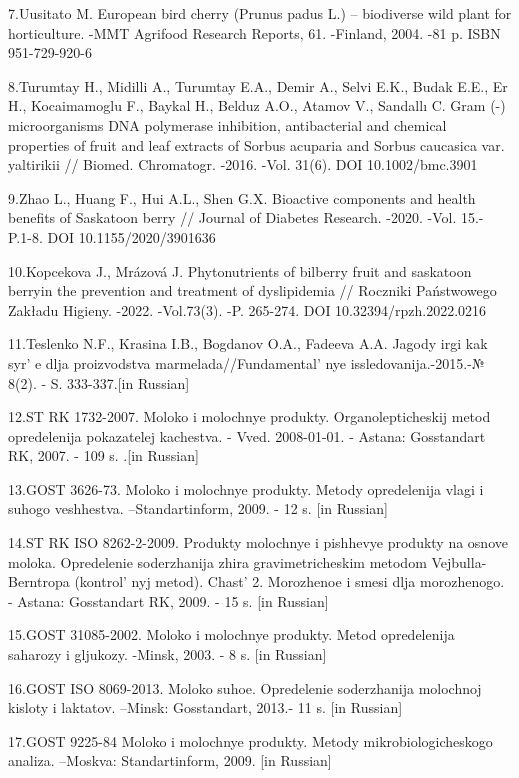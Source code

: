 {{7.Uusitato M. European bird cherry (Prunus padus L.) -- biodiverse wild
plant for horticulture. -MMT Agrifood Research Reports, 61. -Finland,
2004. -81 p. ISBN 951-729-920-6

8.Turumtay H., Midilli A., Turumtay E.A., Demir A., Selvi E.K., Budak
E.E., Er H., Kocaimamoglu F., Baykal H., Belduz A.O., Atamov V.,
Sandallı C. Gram (-) microorganisms DNA polymerase inhibition,
antibacterial and chemical properties of fruit and leaf extracts of
Sorbus acuparia and Sorbus caucasica var. yaltirikii // Biomed.
Chromatogr. -2016. -Vol. 31(6). DOI 10.1002/bmc.3901

9.Zhao L., Huang F., Hui A.L., Shen G.X. Bioactive components and health
benefits of Saskatoon berry // Journal of Diabetes Research. -2020.
-Vol. 15.- P.1-8. DOI 10.1155/2020/3901636

10.Kopcekova J., Mrázová J. Phytonutrients of bilberry fruit and
saskatoon berryin the prevention and treatment of dyslipidemia //
Roczniki Państwowego Zakładu Higieny. -2022. -Vol.73(3). -P. 265-274.
DOI 10.32394/rpzh.2022.0216

11.Teslenko N.F., Krasina I.B., Bogdanov O.A., Fadeeva A.A. Jagody irgi
kak syr' e dlja proizvodstva
marmelada//Fundamental' nye issledovanija.-2015.-№ 8(2).
- S. 333-337.{[}in Russian{]}

12.ST RK 1732-2007. Moloko i molochnye produkty. Organolepticheskij
metod opredelenija pokazatelej kachestva. - Vved. 2008-01-01. - Astana:
Gosstandart RK, 2007. - 109 s. .{[}in Russian{]}

13.GOST 3626-73. Moloko i molochnye produkty. Metody opredelenija vlagi
i suhogo veshhestva. --Standartinform, 2009. - 12 s. {[}in Russian{]}

14.ST RK ISO 8262-2-2009. Produkty molochnye i pishhevye produkty na
osnove moloka. Opredelenie soderzhanija zhira gravimetricheskim metodom
Vejbulla-Berntropa (kontrol' nyj metod).
Chast'{} 2. Morozhenoe i smesi dlja morozhenogo. -
Astana: Gosstandart RK, 2009. - 15 s. {[}in Russian{]}

15.GOST 31085-2002. Moloko i molochnye produkty. Metod opredelenija
saharozy i gljukozy. -Minsk, 2003. - 8 s. {[}in Russian{]}

16.GOST ISO 8069-2013. Moloko suhoe. Opredelenie soderzhanija molochnoj
kisloty i laktatov. --Minsk: Gosstandart, 2013.- 11 s. {[}in Russian{]}

17.GOST 9225-84 Moloko i molochnye produkty. Metody mikrobiologicheskogo
analiza. --Moskva: Standartinform, 2009. {[}in Russian{]}

}}
